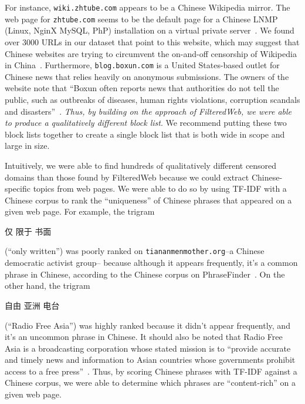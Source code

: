 For instance, \texttt{wiki.zhtube.com} appears to be a Chinese
Wikipedia mirror. The web page for \texttt{zhtube.com} seems to be the
default page for a Chinese LNMP (Linux, NginX MySQL, PhP) installation
on a virtual private server~\cite{lnmp}. We found over 3000 URLs in
our dataset that point to this website, which may suggest that Chinese
websites are trying to circumvent the on-and-off censorship of
Wikipedia in China~\cite{wikipedia-china}. Furthermore,
\texttt{blog.boxun.com} is a United States-based outlet for Chinese
news that relies heavily on anonymous submissions. The owners of the
website note that ``Boxun often reports news that authorities do not
tell the public, such as outbreaks of diseases, human rights
violations, corruption scandals and
disasters''~\cite{boxun-about}. \textit{Thus, by building on the
approach of FilteredWeb, we were able to produce a qualitatively
different block list}. We recommend putting these two block lists
together to create a single block list that is both wide in scope and
large in size.

Intuitively, we were able to find hundreds of qualitatively
different censored domains than those found by FilteredWeb because
we could extract Chinese-specific topics from web pages. We were able
to do so by using TF-IDF with a Chinese corpus to rank the
``uniqueness'' of Chinese phrases that appeared on a given
web page. For example, the trigram
\begin{CJK*}{UTF8}{gbsn}仅 限于 书面\end{CJK*} (``only written'') was poorly ranked on
\texttt{tiananmenmother.org}--a Chinese democratic activist group--
because although it appears frequently, it's a common phrase in
Chinese, according to the Chinese corpus on
PhraseFinder~\cite{phrasefinder}. On the other hand, the
trigram \begin{CJK*}{UTF8}{gbsn}自由 亚洲 电台\end{CJK*} (``Radio Free
Asia'') was highly ranked because it didn't appear frequently, and
it's an uncommon phrase in Chinese. It should also be noted that Radio
Free Asia is a broadcasting corporation whose stated mission is to
``provide accurate and timely news and information to Asian countries
whose governments prohibit access to a free
press''~\cite{rfa:about}. Thus, by scoring Chinese phrases with TF-IDF
against a Chinese corpus, we were able to determine which phrases are
``content-rich'' on a given web page.


